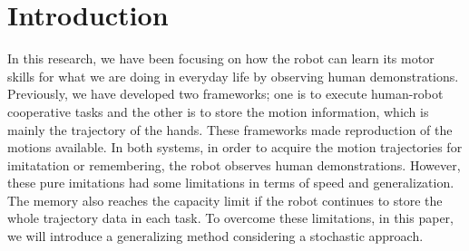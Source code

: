 \section{Introduction}

In this research, we have been focusing on how the robot can learn its motor skills for what we are doing in everyday life by observing human demonstrations. Previously, we have developed two frameworks; one is to execute human-robot cooperative tasks and the other is to store the motion information, which is mainly the trajectory of the hands. These frameworks made reproduction of the motions available. In both systems, in order to acquire the motion trajectories for imitatation or remembering, the robot observes human demonstrations. However, these pure imitations had some limitations in terms of speed and generalization. The memory also reaches the capacity limit if the robot continues to store the whole trajectory data in each task. To overcome these limitations, in this paper, we will introduce a generalizing method considering a stochastic approach.
